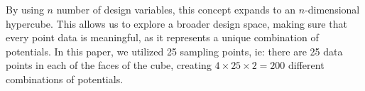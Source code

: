 By using $n$ number of design variables, this concept expands to an $n$-dimensional hypercube. This allows us to explore a broader design space, making sure that every point data is meaningful, as it represents a unique combination of potentials. In this paper, we utilized 25 sampling points, ie: there are 25 data points in each of the faces of the cube, creating $4\times 25 \times 2=200$ different combinations of potentials.











